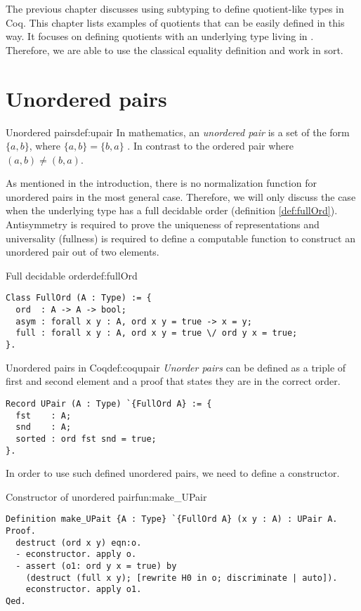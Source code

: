 The previous chapter discusses using subtyping to define quotient-like types in Coq. This chapter lists examples of quotients that can be easily defined in this way. It focuses on defining quotients with an underlying type living in . Therefore, we are able to use the classical equality definition and work in  sort.
\section{Unordered pairs}
\begin{defi}{Unordered pairs}{def:upair}
In mathematics, an \emph{unordered pair} is a set of the form $\{a, b\}$, where $\{a, b\} = \{b, a\}$ \cite{SetTheorey}. In contrast to the ordered pair where $(a, b) \neq (b, a)$.
\end{defi}
As mentioned in the introduction, there is no normalization function for unordered pairs in the most general case. Therefore, we will only discuss the case when the underlying type has a full decidable order (definition \ref{def:fullOrd}). Antisymmetry is required to prove the uniqueness of representations and universality (fullness) is required to define a computable function to construct an unordered pair out of two elements.
\begin{defi}{Full decidable order}{def:fullOrd}
\begin{verbatim}
Class FullOrd (A : Type) := {
  ord  : A -> A -> bool;
  asym : forall x y : A, ord x y = true -> x = y;
  full : forall x y : A, ord x y = true \/ ord y x = true;
}.
\end{verbatim}
\end{defi}
\begin{defi}{Unordered pairs in Coq}{def:coqupair}
\emph{Unorder pairs} can be defined as a triple of first and second element and a proof that states they are in the correct order.
\begin{verbatim}
Record UPair (A : Type) `{FullOrd A} := {
  fst    : A;
  snd    : A;
  sorted : ord fst snd = true;
}.
\end{verbatim}
\end{defi}
In order to use such defined unordered pairs, we need to define a constructor.
\begin{func}{Constructor of unordered pair}{fun:make_UPair}
\begin{verbatim}
Definition make_UPait {A : Type} `{FullOrd A} (x y : A) : UPair A.
Proof.
  destruct (ord x y) eqn:o. 
  - econstructor. apply o.
  - assert (o1: ord y x = true) by
    (destruct (full x y); [rewrite H0 in o; discriminate | auto]).
    econstructor. apply o1.
Qed.
\end{verbatim}
\end{func}

